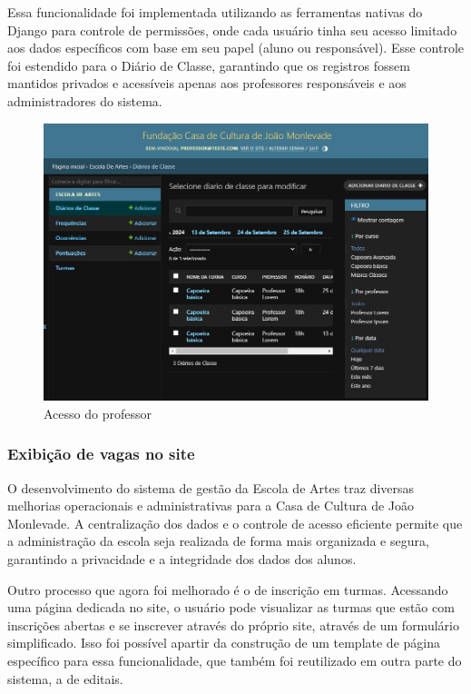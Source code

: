 Essa funcionalidade foi implementada utilizando as ferramentas nativas do Django para controle de permissões, onde cada usuário tinha seu acesso limitado aos dados específicos com base em seu papel (aluno ou responsável). Esse controle foi estendido para o Diário de Classe, garantindo que os registros fossem mantidos privados e acessíveis apenas aos professores responsáveis e aos administradores do sistema.

\begin{figure}[htb]
	\caption{\label{fig_grafico}Acesso do professor}
	\begin{center}
	    \includegraphics[scale=0.5]{./img/admin_professor.png}
	\end{center}
\end{figure}

\subsubsection{Exibição de vagas no site}

O desenvolvimento do sistema de gestão da Escola de Artes traz diversas melhorias operacionais e administrativas para a Casa de Cultura de João Monlevade. A centralização dos dados e o controle de acesso eficiente permite que a administração da escola seja realizada de forma mais organizada e segura, garantindo a privacidade e a integridade dos dados dos alunos.

Outro processo que agora foi melhorado é o de inscrição em turmas. Acessando uma página dedicada no site, o usuário pode visualizar as turmas que estão com inscrições abertas e se inscrever através do próprio site, através de um formulário simplificado. Isso foi possível apartir da construção de um template de página específico para essa funcionalidade, que também foi reutilizado em outra parte do sistema, a de editais.

